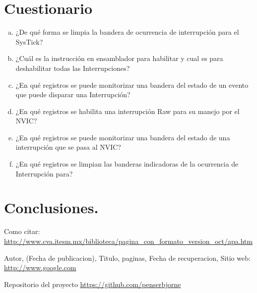 \documentclass[a4paper,11pt]{article}                 %
\begin{document}
  \section{Cuestionario}
   
  
  \begin{enumerate}[a)]

  	\item ¿De qué forma se limpia la bandera de ocurrencia de interrupción para el SysTick? 
  	\item ¿Cuál es la instrucción en ensamblador para habilitar y cual es para deshabilitar todas las Interrupciones?
  	\item ¿En qué registros se puede monitorizar una bandera del estado de un evento que puede disparar una Interrupción? 
  	\item ¿En qué registros se habilita una interrupción Raw para su manejo por el NVIC?
  	\item ¿En qué registros se puede monitorizar una bandera del estado de una interrupción que se pasa al NVIC?
  	\item ¿En qué registros se limpian las banderas indicadoras de la ocurrencia de Interrupción para? 
  	  
  \end{enumerate}




\section{Conclusiones.}
  \begin{thebibliography}{}                           %
      Como citar: \url{http://www.cva.itesm.mx/biblioteca/pagina_con_formato_version_oct/apa.htm} %

      Autor,
      (Fecha de publicacion),
      Titulo, paginas,
      Fecha de recuperacion,
      Sitio web: \url{http://www.google.com}

      Repositorio del proyecto \url{https://github.com/penserbjorne}
  \end{thebibliography}

\end{document}

